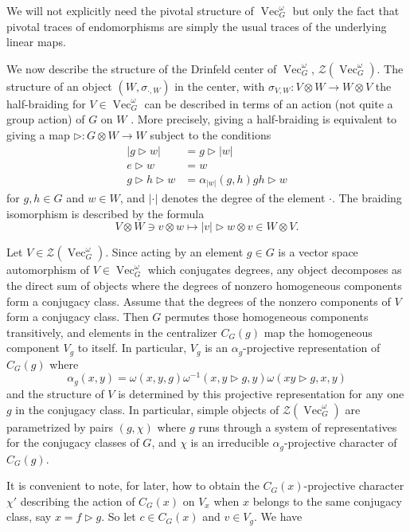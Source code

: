 \documentclass[a4paper, 10pt]{book}
\theoremstyle{definition}
\numberwithin{equation}{chapter}
\newcommand\hit{\triangleright}
\newcommand\ot{\otimes}
\newcommand\Vect{\operatorname{Vec}}
\newcommand\CTR{\mathcal Z}
\begin{document}
We will not explicitly need the pivotal structure of $\Vect^\omega_G$ but only the fact that pivotal traces of endomorphisms are simply the usual traces of the underlying linear maps.

We now describe the structure of the Drinfeld center of $\Vect^\omega_G$, $\mathcal{Z}(\Vect^\omega_G)$. The structure of an object $(W,\sigma_{\cdot,W})$ in the center, with $\sigma_{V,W}\colon V\ot W\to W\ot V$ the half-braiding for $V\in\Vect_G^\omega$ can be described in terms of an action (not quite a group action) of $G$ on $W$ \cite{Maj:QDQHA}. More precisely, giving a half-braiding is equivalent to giving a map
$\hit\colon G\otimes W\to W$ subject to the conditions
\begin{align}
  |g\hit w|&=g\hit|w|\\
  e\hit w&=w\\
  g\hit h\hit w&=\alpha_{|w|}(g, h)gh\hit w
\end{align}
for $g,h\in G$ and $w\in W$, and $|\cdot|$ denotes the degree of the element $\cdot$. The braiding isomorphism is described by the formula
\begin{equation*}
  V\ot W\ni v\ot w\mapsto |v|\hit w\ot v\in W\ot V.
\end{equation*}

Let $V\in\CTR(\Vect_G^\omega)$. Since acting by an element $g\in G$ is a vector space automorphism of $V\in\Vect_G^\omega$ which conjugates degrees, any object decomposes as the direct sum of objects where the degrees of nonzero homogeneous components form a conjugacy class. Assume that the degrees of the nonzero components of $V$ form a conjugacy class. Then $G$ permutes those homogeneous components transitively, and elements in the centralizer $C_G(g)$ map the homogeneous component $V_g$ to itself. In particular, $V_g$ is an $\alpha_g$-projective representation of $C_G(g)$ where
\begin{equation}\label{alpha}
\alpha_g(x,y)=\omega(x,y,g)\omega^{-1}(x,y \hit g,y)\omega(xy \hit g ,x ,y)
\end{equation}
and the structure of $V$ is determined by this projective representation for any one $g$ in the conjugacy class. In particular, simple objects of $\CTR(\Vect_G^\omega)$ are parametrized by pairs $(g,\chi)$ where $g$ runs through a system of representatives for the conjugacy classes of $G$, and $\chi$ is an irreducible $\alpha_g$-projective character of $C_G(g)$.

It is convenient to note, for later, how to obtain the $C_G(x)$-projective character $\chi'$ describing the action of $C_G(x)$ on $V_x$ when $x$ belongs to the same conjugacy class, say $x=f\hit g$. So let $c\in C_G(x)$ and $v\in V_g$. We have
\end{document}
